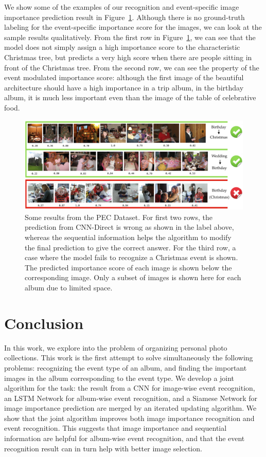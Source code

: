 \documentclass[runningheads]{llncs}
\begin{document}
We show some of the examples of our recognition and event-specific image importance prediction result in Figure~\ref{pec_result}. Although there is no ground-truth labeling for the event-specific importance score for the images, we can look at the sample results qualitatively. From the first row in Figure~\ref{pec_result}, we can see that the model does not simply assign a high importance score to the characteristic Christmas tree, but predicts a very high score when there are people sitting in front of the Christmas tree. From the second row, we can see the property of the event modulated importance score: although the first image of the beautiful architecture should have a high importance in a trip album, in the birthday album, it is much less important even than the image of the table of celebrative food.
\begin{figure}[ht]
\centering
\includegraphics[width=4.8in]{pec_result}
\caption{Some results from the PEC Dataset. For first two rows, the prediction from CNN-Direct is wrong as shown in the label above, whereas the sequential information helps the algorithm to modify the final prediction to give the correct answer. For the third row, a case where the model fails to recognize a Christmas event is shown. The predicted importance score of each image is shown below the corresponding image. Only a subset of images is shown here for each album due to limited space.}
\label{pec_result}
\vspace{-0.15in}
\end{figure}

\section{Conclusion}
In this work, we explore into the problem of organizing personal photo collections. This work is the first attempt to solve simultaneously the following problems: recognizing the event type of an album, and finding the important images in the album corresponding to the event type. We develop a joint algorithm for the task: the result from a CNN for image-wise event recognition, an LSTM Network for album-wise event recognition, and a Siamese Network for image importance prediction are merged by an iterated updating algorithm. We show that the joint algorithm improves both image importance recognition and event recognition. This suggests that image importance and sequential information are helpful for album-wise event recognition, and that the event recognition result can in turn help with better image selection. 
\clearpage



\clearpage


\end{document}
